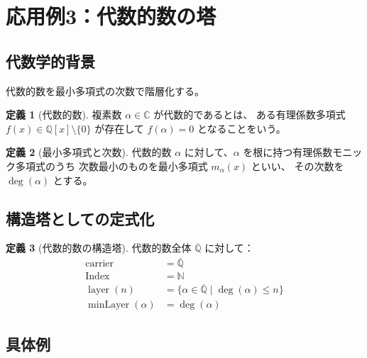 \documentclass[a4paper,12pt]{ltjsarticle}
\theoremstyle{definition}
\newtheorem{definition}{定義}[section]
\newcommand{\N}{\mathbb{N}}
\newcommand{\Q}{\mathbb{Q}}
\newcommand{\C}{\mathbb{C}}
\DeclareMathOperator{\layer}{layer}
\DeclareMathOperator{\minLayer}{minLayer}
\DeclareMathOperator{\deg}{deg}
\begin{document}
\section{応用例3：代数的数の塔}

\subsection{代数学的背景}

代数的数を最小多項式の次数で階層化する。

\begin{definition}[代数的数]
複素数 $\alpha \in \C$ が代数的であるとは、
ある有理係数多項式 $f(x) \in \Q[x] \setminus \{0\}$ が存在して
$f(\alpha) = 0$ となることをいう。
\end{definition}

\begin{definition}[最小多項式と次数]
代数的数 $\alpha$ に対して、$\alpha$ を根に持つ有理係数モニック多項式のうち
次数最小のものを最小多項式 $m_\alpha(x)$ といい、
その次数を $\deg(\alpha)$ とする。
\end{definition}

\subsection{構造塔としての定式化}

\begin{definition}[代数的数の構造塔]
代数的数全体 $\overline{\Q}$ に対して：
\begin{align*}
\mathrm{carrier} &= \overline{\Q} \\
\mathrm{Index} &= \N \\
\layer(n) &= \{\alpha \in \overline{\Q} \mid \deg(\alpha) \leq n\} \\
\minLayer(\alpha) &= \deg(\alpha)
\end{align*}
\end{definition}

\subsection{具体例}
\end{document}
